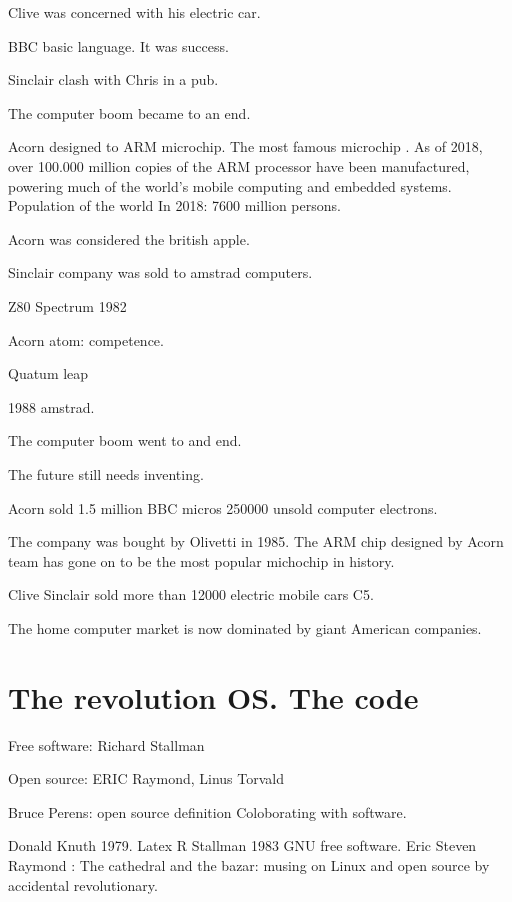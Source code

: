    Clive was concerned with his electric car. 
   
   BBC basic language. It was success. 
   
   
   Sinclair clash with Chris in a pub. 
   
   The computer boom became to an end. 
   
   Acorn designed to ARM microchip. The most famous microchip . 
   As of 2018, over 100.000 million copies of the ARM processor have been manufactured, powering much of the world's mobile computing and 
   embedded systems. Population of the world 
   In 2018: 7600 million persons. 
    
   
   Acorn was considered the british apple. 
   
   Sinclair company was sold to amstrad computers. 
   
   
    
   Z80
   Spectrum 1982 
   
   Acorn atom: competence. 
   
   
   
   Quatum leap 
   
   1988 amstrad. 
   
   The computer boom went to and end. 
   
   The future still needs inventing. 
   
   Acorn sold 1.5 million BBC micros 
   250000 unsold computer electrons. 
   
   The company was bought by Olivetti in 1985. 
   The ARM chip designed by Acorn team has gone on to be the most popular michochip in history. 
   
   Clive Sinclair sold more than 12000 electric mobile cars C5. 
   
   The home computer market is now dominated by giant American companies. 
   
   
  
  \section{The revolution OS. The code}
  Free software: Richard Stallman 
  
  Open source: ERIC Raymond, Linus Torvald 
  
  
  Bruce Perens: open source definition 
  Coloborating with software. 
  
  Donald Knuth 1979. Latex 
  R Stallman 1983 GNU free software. 
  Eric Steven Raymond : The cathedral and the bazar: musing on Linux and open source by accidental revolutionary. 
  
